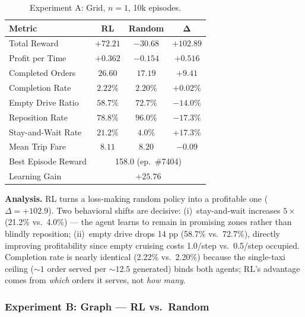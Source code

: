 \begin{table}[ht]
\centering
\caption{Experiment A: Grid, $n{=}1$, 10k episodes.}
\label{tab:res-a}
\begin{tabular}{lccc}
\toprule
\textbf{Metric} & \textbf{RL} & \textbf{Random} & $\bm{\Delta}$ \\
\midrule
Total Reward          & $+72.21$ & $-30.68$ & $+102.89$ \\
Profit per Time       & $+0.362$ & $-0.154$ & $+0.516$ \\
Completed Orders      & $26.60$  & $17.19$  & $+9.41$ \\
Completion Rate       & $2.22\%$ & $2.20\%$ & $+0.02\%$ \\
Empty Drive Ratio     & $58.7\%$ & $72.7\%$ & $-14.0\%$ \\
Reposition Rate       & $78.8\%$ & $96.0\%$ & $-17.3\%$ \\
Stay-and-Wait Rate    & $21.2\%$ & $4.0\%$  & $+17.3\%$ \\
Mean Trip Fare        & $8.11$   & $8.20$   & $-0.09$ \\
\midrule
Best Episode Reward   & \multicolumn{3}{c}{158.0 (ep.\ \#7404)} \\
Learning Gain         & \multicolumn{3}{c}{$+25.76$} \\
\bottomrule
\end{tabular}
\end{table}

\textbf{Analysis.} RL turns a loss-making random policy into a profitable one ($\Delta{=}{+}102.9$). Two behavioral shifts are decisive: (i)~stay-and-wait increases $5{\times}$ (21.2\% vs.\ 4.0\%) — the agent learns to remain in promising zones rather than blindly reposition; (ii)~empty drive drops 14 pp (58.7\% vs.\ 72.7\%), directly improving profitability since empty cruising costs 1.0/step vs.\ 0.5/step occupied. Completion rate is nearly identical (2.22\% vs.\ 2.20\%) because the single-taxi ceiling (${\sim}1$ order served per ${\sim}12.5$ generated) binds both agents; RL's advantage comes from \emph{which} orders it serves, not \emph{how many}.

\subsubsection{Experiment B: Graph — RL vs.\ Random}

